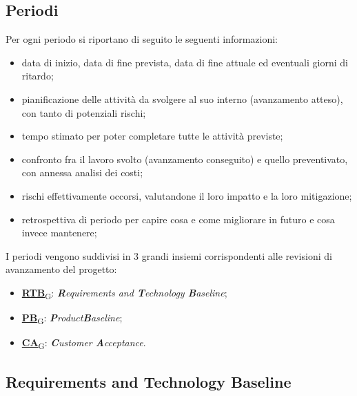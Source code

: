 \subsection{Periodi}
Per ogni periodo si riportano di seguito le seguenti informazioni:
\begin{itemize}
    \item data di inizio, data di fine prevista, data di fine attuale ed eventuali giorni di ritardo;
    \item pianificazione delle attività da svolgere al suo interno (avanzamento atteso), con tanto di potenziali rischi;
    \item tempo stimato per poter completare tutte le attività previste;
    \item confronto fra il lavoro svolto (avanzamento conseguito) e quello preventivato, con annessa analisi dei costi;
    \item rischi effettivamente occorsi, valutandone il loro impatto e la loro mitigazione;
    \item retrospettiva di periodo per capire cosa e come migliorare in futuro e cosa invece mantenere;
\end{itemize}
I periodi vengono suddivisi in 3 grandi insiemi corrispondenti alle revisioni di avanzamento del progetto:
\begin{itemize}
    \item \href{https://7last.github.io/docs/rtb/documentazione-interna/glossario\#rtb}{\textbf{RTB}\textsubscript{G}}: \textit{\textbf{R}equirements and \textbf{T}echnology \textbf{B}aseline};
    \item \href{https://7last.github.io/docs/rtb/documentazione-interna/glossario\#pb}{\textbf{PB}\textsubscript{G}}:  \textit{\textbf{P}roduct\textbf{B}aseline};
    \item \href{https://7last.github.io/docs/rtb/documentazione-interna/glossario\#ca}{\textbf{CA}\textsubscript{G}}:  \textit{\textbf{C}ustomer \textbf{A}cceptance}.
\end{itemize}

\subsection{Requirements and Technology Baseline}
